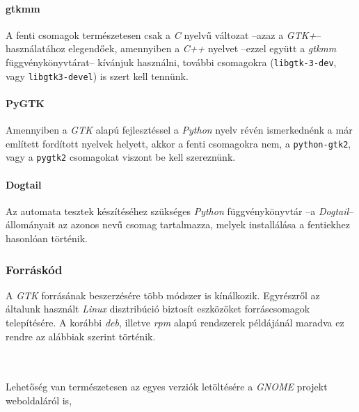 \paragraph{gtkmm}

A fenti csomagok természetesen csak a \textit{C} nyelvű változat --azaz a \textit{GTK+}-- használatához elegendőek, amennyiben a \textit{C++} nyelvet --ezzel együtt a \textit{gtkmm} függvénykönyvtárat-- kívánjuk használni, további csomagokra (\texttt{libgtk-3-dev}, vagy \texttt{libgtk3-devel}) is szert kell tennünk.

\paragraph{PyGTK}

Amennyiben a \textit{GTK} alapú fejlesztéssel a \textit{Python} nyelv révén ismerkednénk a már említett fordított nyelvek helyett, akkor a fenti csomagokra nem, a \texttt{python-gtk2}, vagy a \texttt{pygtk2} csomagokat viszont be kell szereznünk.

\paragraph{Dogtail}

Az automata tesztek készítéséhez szükséges \textit{Python} függvénykönyvtár --a \textit{Dogtail}-- állományait az azonos nevű csomag tartalmazza, melyek installálása a fentiekhez hasonlóan történik.

\subsubsection{Forráskód}

A \textit{GTK} forrásának beszerzésére több módszer is kínálkozik. Egyrészről az általunk használt \textit{Linux} disztribúció biztosít eszközöket forráscsomagok telepítésére. A korábbi \textit{deb}, illetve \textit{rpm} alapú rendszerek példájánál maradva ez rendre az alábbiak szerint történik.

\\
\\

Lehetőség van természetesen az egyes verziók letöltésére a \textit{GNOME} projekt weboldaláról is,

\\
\\

